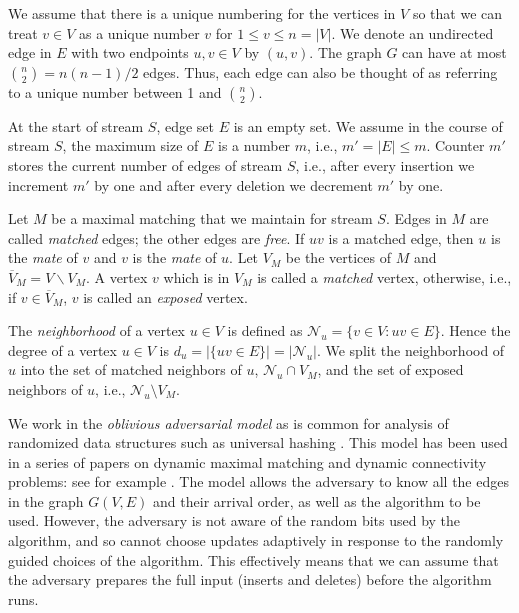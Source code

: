 \documentclass[11pt,letter]{article}
\renewcommand{\paragraph}[1]{\medskip \noindent {\bf #1}}
\begin{document}
We assume that there is a unique numbering for the vertices in
$V$ so that we can treat $v \in V$ as a unique number $v$ for $1 \le v \le n=|V|$.
We denote an undirected edge in $E$ with two endpoints $u,v\in V$ by
$(u,v)$. The graph $G$ can
have at most ${n \choose 2} = n(n-1)/2$ edges.
Thus, each edge can also be thought of as referring to a unique number
between 1 and ${n \choose 2}$.



At the start of stream $S$, edge set $E$ is an empty set.
We assume in the course of stream $S$, the maximum size of $E$ is a
number $m$, i.e., $m'=|E|\le m$. Counter $m'$ stores the current number of
edges of stream $S$, i.e., after every insertion we increment $m'$ by one and
after every deletion we decrement $m'$ by one.


Let $M$ be a maximal matching that we maintain for stream $S$.
Edges in $M$ are called \textit{matched} edges; the other edges are \textit{free}.
If $uv$ is a matched edge, then $u$ is the \textit{mate} of $v$ and $v$ is the
\textit{mate} of $u$. Let $V_M$ be the vertices of $M$ and
$\overline{V}_M=V\backslash V_M$. A vertex $v$ which is in $V_M$ is called
a \textit{matched} vertex, otherwise, i.e., if $v\in\overline{V}_M$, $v$ is called
an \textit{exposed} vertex.

The \textit{neighborhood} of a vertex $u\in V$ is defined as
$\mathcal{N}_u=\{v\in V: uv\in E\}$. Hence the degree of a vertex
$u\in V$ is $d_u=|\{uv\in E\}|=|\mathcal{N}_u|$.
We split the neighborhood of $u$ into the set
of matched neighbors of $u$, $\mathcal{N}_u \cap V_M$, and the set
of exposed neighbors of $u$, i.e.,
$\mathcal{N}_u \setminus V_M$.






\paragraph{Oblivious Adversarial Model.}
We work in the \textit{oblivious adversarial model} as is common for analysis of randomized data structures
such as universal hashing \cite{CW77}.
This model has been used in a series of papers on
dynamic maximal matching and dynamic connectivity problems: see for example
\cite{OR10, BGS11, KKM13, NS13}.
The model allows the adversary to know all the edges in the graph
$G(V,E)$ and their arrival order, as well as the algorithm to be
used.
However, the adversary is not aware of the random bits used by the
algorithm, and so cannot choose updates adaptively in response to the
randomly guided choices of the algorithm.
This effectively means that we can assume that the adversary prepares
the full input (inserts and deletes) before the algorithm runs.
\end{document}

